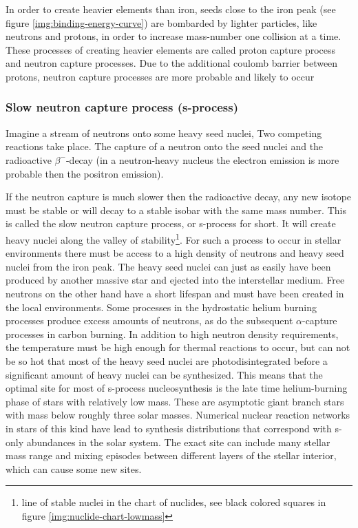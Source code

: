 In order to create heavier elements than iron, seeds close to the iron peak (see figure \ref{img:binding-energy-curve})
are bombarded by lighter particles, like neutrons and protons, in order to increase mass-number one collision at a time.
These processes of creating heavier elements are called proton capture process and neutron capture processes.
Due to the additional coulomb barrier between protons, neutron capture processes are more probable and likely to occur

\subsubsection{Slow neutron capture process (s-process)} \label{sec:sncp}
Imagine a stream of neutrons onto some heavy seed nuclei, Two competing reactions take place.
The capture of a neutron onto the seed nuclei and the radioactive $\beta^-$-decay
(in a neutron-heavy nucleus the electron emission is more probable then the positron emission).

If the neutron capture is much slower then the radioactive decay, any new
isotope must be stable or will decay to a stable isobar with the same mass number. This is called the slow neutron capture process, or s-process for short.
It will create heavy nuclei along the valley of stability\footnote{line of stable nuclei in the chart of nuclides, see black colored squares in figure \ref{img:nuclide-chart-lowmass}}.
For such a process to occur in stellar environments there must be access to a high density of neutrons and heavy seed nuclei from the iron peak.
The heavy seed nuclei can just as easily have been produced by another massive star and ejected into the interstellar medium. Free neutrons on the other hand have a short lifespan and must have been created in the local environments.
Some processes in the hydrostatic helium burning processes produce excess amounts of neutrons, as do the subsequent $\alpha$-capture processes in carbon burning.
In addition to high neutron density requirements, the temperature must be high enough for thermal reactions to occur, but can not be so hot that most of the heavy seed nuclei are photodisintegrated before a significant amount of heavy nuclei can be synthesized.
This means that the optimal site for most of s-process nucleosynthesis is the late time helium-burning phase of stars with relatively low mass. These are asymptotic giant branch stars with mass below roughly three solar masses.
Numerical nuclear reaction networks in stars of this kind have lead to synthesis distributions that correspond with s-only abundances in the solar system.
The exact site can include many stellar mass range and mixing episodes between different layers of the stellar interior, which can cause some new sites.

